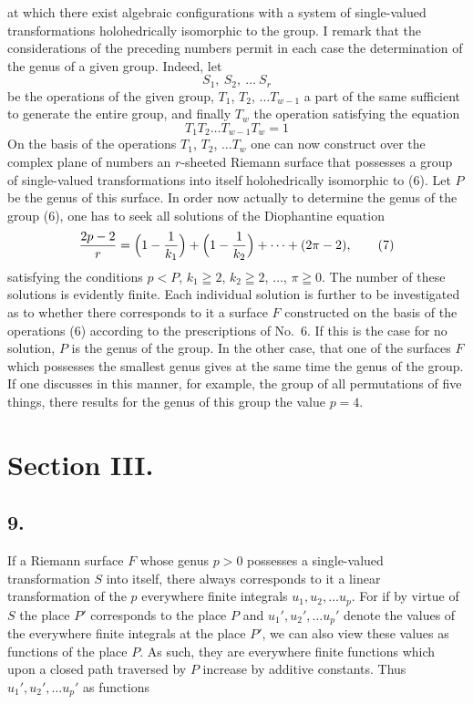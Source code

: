 \documentclass{article}
\begin{document}
at which there exist algebraic configurations with a system of single-valued transformations holohedrically isomorphic to the group. I remark that the considerations of the preceding numbers permit in each case the determination of the genus of a given group. Indeed, let
\[
S_1, \ S_2, \ \dots \ S_r
\tag{6}
\]
be the operations of the given group, $T_1$, $T_2$, $\dots T_{w-1}$ a part of the same sufficient to generate the entire group, and finally $T_w$ the operation satisfying the equation
\[
T_1 T_2 \dots T_{w-1} T_w = 1
\]
On the basis of the operations $T_1$, $T_2$, $\dots T_w$ one can now construct over the complex plane of numbers an $r$-sheeted Riemann surface that possesses a group of single-valued transformations into itself holohedrically isomorphic to (6). Let $P$ be the genus of this surface. In order now actually to determine the genus of the group (6), one has to seek all solutions of the Diophantine equation
\[
\frac{2p - 2}{r} = \Bigl(1 - \frac{1}{k_1}\Bigr) + \Bigl(1 - \frac{1}{k_2}\Bigr) + \dots + (2\pi - 2),
\tag{7}
\]
satisfying the conditions $p < P$, $k_1 \geqq 2$, $k_2 \geqq 2$, $\dots$, $\pi \geqq 0$. The number of these solutions is evidently finite. Each individual solution is further to be investigated as to whether there corresponds to it a surface $F$ constructed on the basis of the operations (6) according to the prescriptions of No.~6. If this is the case for no solution, $P$ is the genus of the group. In the other case, that one of the surfaces $F$ which possesses the smallest genus gives at the same time the genus of the group. If one discusses in this manner, for example, the group of all permutations of five things, there results for the genus of this group the value $p = 4$.

\section*{Section III.}

\subsection*{9.}

If a Riemann surface $F$ whose genus $p > 0$ possesses a single-valued transformation $S$ into itself, there always corresponds to it a linear transformation of the $p$ everywhere finite integrals $u_1, u_2, \dots u_p$. For if by virtue of $S$ the place $P'$ corresponds to the place $P$ and $u_1', u_2', \dots u_p'$ denote the values of the everywhere finite integrals at the place $P'$, we can also view these values as functions of the place $P$. As such, they are everywhere finite functions which upon a closed path traversed by $P$ increase by additive constants. Thus $u_1', u_2', \dots u_p'$ as functions
\end{document}
